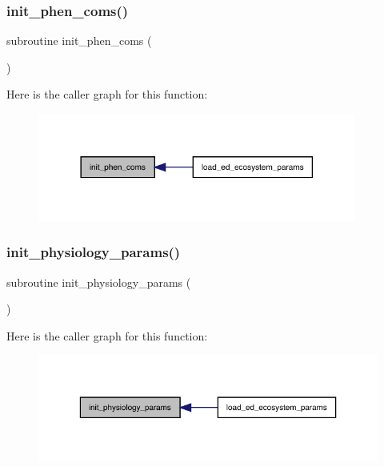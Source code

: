 \subsubsection{\texorpdfstring{init\+\_\+phen\+\_\+coms()}{init\_phen\_coms()}}
{\footnotesize\ttfamily subroutine init\+\_\+phen\+\_\+coms (\begin{DoxyParamCaption}{ }\end{DoxyParamCaption})}

Here is the caller graph for this function\+:
\nopagebreak
\begin{figure}[H]
\begin{center}
\leavevmode
\includegraphics[width=297pt]{ed__params_8f90_a042d48afe0e36c29a7065500b43004b6_icgraph}
\end{center}
\end{figure}
\mbox{\label{ed__params_8f90_a143d565950a95de202237d4e388101c9}} 
\subsubsection{\texorpdfstring{init\+\_\+physiology\+\_\+params()}{init\_physiology\_params()}}
{\footnotesize\ttfamily subroutine init\+\_\+physiology\+\_\+params (\begin{DoxyParamCaption}{ }\end{DoxyParamCaption})}

Here is the caller graph for this function\+:
\nopagebreak
\begin{figure}[H]
\begin{center}
\leavevmode
\includegraphics[width=323pt]{ed__params_8f90_a143d565950a95de202237d4e388101c9_icgraph}
\end{center}
\end{figure}
\mbox{\label{ed__params_8f90_a3ef1627f6aff0ad10ca705f74d615bf7}} 
